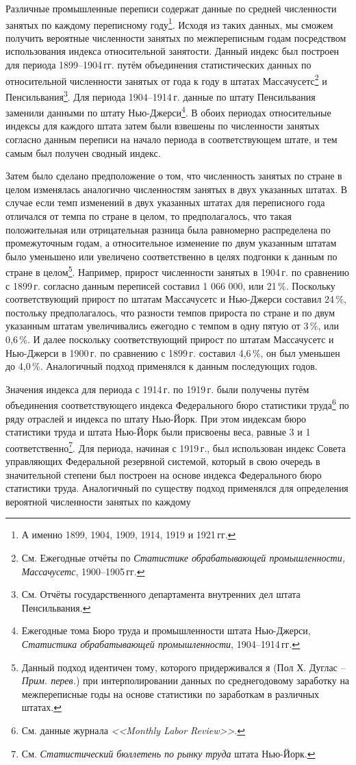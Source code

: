 \documentclass[leqno]{article}  %
\begin{document}
Различные промышленные переписи содержат данные по средней численности занятых по каждому переписному году\footnote{А именно 1899, 1904, 1909, 1914, 1919 и 1921\,гг.}. Исходя из таких данных, мы сможем получить вероятные численности занятых по межпереписным годам посредством использования индекса относительной занятости. Данный индекс был построен для периода 1899--1904\,гг. путём объединения статистических данных по относительной численности занятых от года к году в штатах Массачусетс\footnote{См. Ежегодные отчёты по \emph{Статистике обрабатывающей промышленности, Массачусетс}, 1900--1905\,гг.} и Пенсильвания\footnote{См. Отчёты государственного департамента внутренних дел штата Пенсильвания.}. Для периода 1904--1914\,г. данные по штату Пенсильвания заменили данными по штату Нью-Джерси\footnote{Ежегодные тома Бюро труда и промышленности штата Нью-Джерси, \emph{Статистика обрабатывающей промышленности}, 1904--1914\,гг.}. В обоих периодах относительные индексы для каждого штата затем были взвешены по численности занятых согласно данным переписи на начало периода в соответствующем штате, и тем самым был получен сводный индекс.
\par
Затем было сделано предположение о том, что численность занятых по стране в целом изменялась аналогично численностям занятых в двух указанных штатах. В случае если темп изменений в двух указанных штатах для переписного года отличался от темпа по стране в целом, то предполагалось, что такая положительная или отрицательная разница была равномерно распределена по промежуточным годам, а относительное изменение по двум указанным штатам было уменьшено или увеличено соответственно в целях подгонки к данным по стране в целом\footnote{Данный подход идентичен тому, которого придерживался я (Пол Х. Дуглас -- \emph{Прим. перев.}) при интерполировании данных по среднегодовому заработку на межпереписные годы на основе статистики по заработкам в различных штатах.}. Например, прирост численности занятых в 1904\,г. по сравнению с 1899\,г. согласно данным переписей составил 1 066 000, или 21\,\%. Поскольку соответствующий прирост по штатам Массачусетс и Нью-Джерси составил 24\,\%, постольку предполагалось, что разности темпов прироста по стране и по двум указанным штатам увеличивались ежегодно с темпом в одну пятую от 3\,\%, или 0,6\,\%. И далее поскольку соответствующий прирост по штатам Массачусетс и Нью-Джерси в 1900\,г. по сравнению с 1899\,г. составил 4,6\,\%, он был уменьшен до 4,0\,\%. Аналогичный подход применялся к данным последующих годов.
\par
Значения индекса для периода с 1914\,г. по 1919\,г. были получены путём объединения соответствующего индекса Федерального бюро статистики труда\footnote{См. данные журнала \emph{<<Monthly Labor Review>>}.} по ряду отраслей и индекса по штату Нью-Йорк. При этом индексам бюро статистики труда и штата Нью-Йорк были присвоены веса, равные 3 и 1 соответственно\footnote{См. \emph{Статистический бюллетень по рынку труда} штата Нью-Йорк.}. Для периода, начиная с 1919\,г., был использован индекс Совета управляющих Федеральной резервной системой, который в свою очередь в значительной степени был построен на основе индекса Федерального бюро статистики труда. Аналогичный по существу подход применялся для определения вероятной численности занятых по каждому
\end{document}
